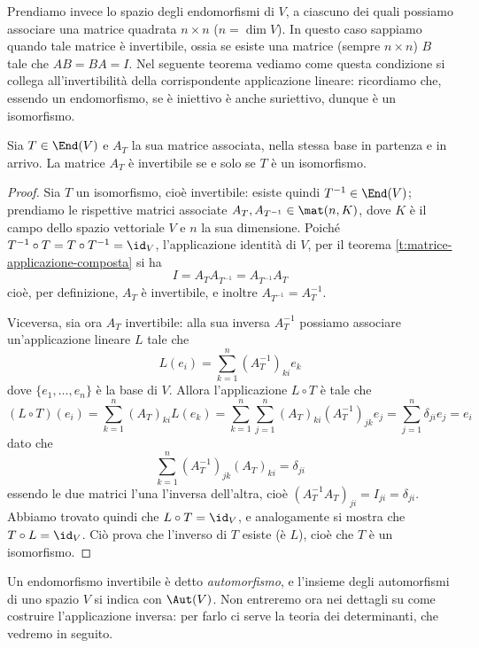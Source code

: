 Prendiamo invece lo spazio degli endomorfismi di $V$, a ciascuno dei quali possiamo associare una matrice quadrata $n\times n$ ($n=\dim V$).
In questo caso sappiamo quando tale matrice è invertibile, ossia se esiste una matrice (sempre $n\times n$) $B$ tale che $AB=BA=I$.
Nel seguente teorema vediamo come questa condizione si collega all'invertibilità della corrispondente applicazione lineare: ricordiamo che, essendo un endomorfismo, se è iniettivo è anche suriettivo, dunque è un isomorfismo.
\begin{teorema} \label{t:invertibilita-matrice-associata}
	Sia $T\in\End(V)$ e $A_T$ la sua matrice associata, nella stessa base in partenza e in arrivo.
	La matrice $A_T$ è invertibile se e solo se $T$ è un isomorfismo.
\end{teorema}
\begin{proof}
	Sia $T$ un isomorfismo, cioè invertibile: esiste quindi $T^{-1}\in\End(V)$; prendiamo le rispettive matrici associate $A_T,A_{T^{-1}}\in\mat(n,K)$, dove $K$ è il campo dello spazio vettoriale $V$ e $n$ la sua dimensione.
	Poich\'e $T^{-1}\circ T=T\circ T^{-1}=\id_V$, l'applicazione identità di $V$, per il teorema \ref{t:matrice-applicazione-composta} si ha
	\begin{equation}
		I=A_TA_{T^{-1}}=A_{T^{-1}}A_T
	\end{equation}
	cioè, per definizione, $A_T$ è invertibile, e inoltre $A_{T^{-1}}=A_T^{-1}$.

	Viceversa, sia ora $A_T$ invertibile: alla sua inversa $A_T^{-1}$ possiamo associare un'applicazione lineare $L$ tale che
	\begin{equation}
		L(e_i)=\sum_{k=1}^n(A_T^{-1})_{ki}e_k
	\end{equation}
	dove $\{e_1,\dots,e_n\}$ è la base di $V$.
	Allora l'applicazione $L\circ T$ è tale che
	\begin{equation}
		(L\circ T)(e_i)=\sum_{k=1}^n(A_T)_{ki}L(e_k)=\sum_{k=1}^n\sum_{j=1}^n(A_T)_{ki}(A_T^{-1})_{jk}e_j=\sum_{j=1}^n\delta_{ji}e_j=e_i
	\end{equation}
	dato che
	\begin{equation}
		\sum_{k=1}^n(A_T^{-1})_{jk}(A_T)_{ki}=\delta_{ji}
	\end{equation}
	essendo le due matrici l'una l'inversa dell'altra, cioè $(A_T^{-1}A_T)_{ji}=I_{ji}=\delta_{ji}$.
	Abbiamo trovato quindi che $L\circ T=\id_V$, e analogamente si mostra che $T\circ L=\id_V$.
	Ciò prova che l'inverso di $T$ esiste (è $L$), cioè che $T$ è un isomorfismo.
\end{proof}
Un endomorfismo invertibile è detto \emph{automorfismo}, e l'insieme degli automorfismi di uno spazio $V$ si indica con $\Aut(V)$.
Non entreremo ora nei dettagli su come costruire l'applicazione inversa: per farlo ci serve la teoria dei determinanti, che vedremo in seguito.
